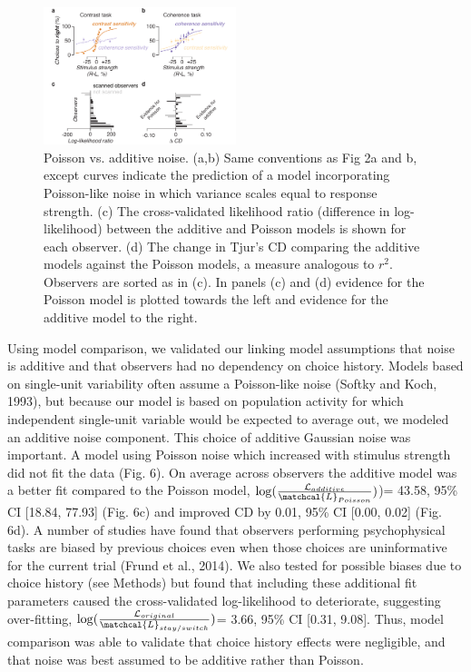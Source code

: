 \documentclass{report}
\begin{document}
\begin{figure}
\centering
\includegraphics[keepaspectratio,width=0.5\textwidth]{figs_c2/Fig6_poisson.pdf}
\caption[Poisson vs. additive noise]{Poisson vs. additive noise. (a,b) Same conventions as Fig 2a and b, except curves indicate the prediction of a model incorporating Poisson-like noise in which variance scales equal to response strength. (c) The cross-validated likelihood ratio (difference in log-likelihood) between the additive and Poisson models is shown for each observer. (d) The change in Tjur’s CD comparing the additive models against the Poisson models, a measure analogous to $r^2$. Observers are sorted as in (c). In panels (c) and (d) evidence for the Poisson model is plotted towards the left and evidence for the additive model to the right.}
\label{fig:c4f6}
\end{figure}

Using model comparison, we validated our linking model assumptions that noise is additive and that observers had no dependency on choice history. Models based on single-unit variability often assume a Poisson-like noise (Softky and Koch, 1993), but because our model is based on population activity for which independent single-unit variable would be expected to average out, we modeled an additive noise component. This choice of additive Gaussian noise was important. A model using Poisson noise which increased with stimulus strength did not fit the data (Fig. 6). On average across observers the additive model was a better fit compared to the Poisson model, $\log(\frac{\mathcal{L}_{additive}}{\matchcal{L}_{Poisson}})$)= 43.58, 95\% CI [18.84, 77.93] (Fig. 6c) and improved CD by 0.01, 95\% CI [0.00, 0.02] (Fig. 6d). A number of studies have found that observers performing psychophysical tasks are biased by previous choices even when those choices are uninformative for the current trial \citep{Abrahamyan2016-od} (Frund et al., 2014). We also tested for possible biases due to choice history (see Methods) but found that including these additional fit parameters caused the cross-validated log-likelihood to deteriorate, suggesting over-fitting, $\log(\frac{\mathcal{L}_{original}}{\matchcal{L}_{stay/switch}})$= 3.66, 95\% CI [0.31, 9.08]. Thus, model comparison was able to validate that choice history effects were negligible, and that noise was best assumed to be additive rather than Poisson.
\end{document}
